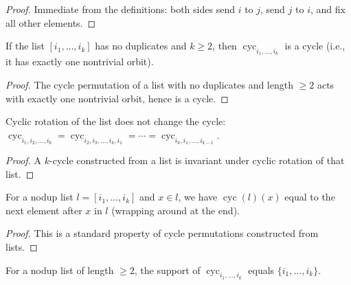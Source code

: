 \begin{proof}
\leanok
Immediate from the definitions: both sides send $i$ to $j$, send $j$ to $i$, and fix all other elements.
\end{proof}

\begin{lemma}
\label{lem.perm.cycs.isCycle}
\leanhelper
\leanok
If the list $[i_1, \ldots, i_k]$ has no duplicates and $k \ge 2$, then
$\operatorname{cyc}_{i_1, \ldots, i_k}$ is a cycle (i.e., it has exactly one
nontrivial orbit).
\end{lemma}

\begin{proof}
\leanok
The cycle permutation of a list with no duplicates and length $\ge 2$
acts with exactly one nontrivial orbit, hence is a cycle.
\end{proof}

\begin{lemma}
\label{lem.perm.cycs.rotate}
\leanhelper
\leanok
Cyclic rotation of the list does not change the cycle:
$\operatorname{cyc}_{i_1, i_2, \ldots, i_k} = \operatorname{cyc}_{i_2, i_3, \ldots, i_k, i_1} = \cdots = \operatorname{cyc}_{i_k, i_1, \ldots, i_{k-1}}$.
\end{lemma}

\begin{proof}
\leanok
A $k$-cycle constructed from a list is invariant under cyclic rotation of that list.
\end{proof}

\begin{lemma}
\label{lem.perm.cycs.next}
\leanhelper
\leanok
For a nodup list $l = [i_1, \ldots, i_k]$ and $x \in l$, we have
$\operatorname{cyc}(l)(x)$ equal to the next element after $x$ in $l$ (wrapping
around at the end).
\end{lemma}

\begin{proof}
\leanok
This is a standard property of cycle permutations constructed from lists.
\end{proof}

\begin{lemma}
\label{lem.perm.cycs.support}
\leanhelper
\leanok
For a nodup list of length $\ge 2$, the support of $\operatorname{cyc}_{i_1, \ldots, i_k}$
equals $\{i_1, \ldots, i_k\}$.
\end{lemma}

